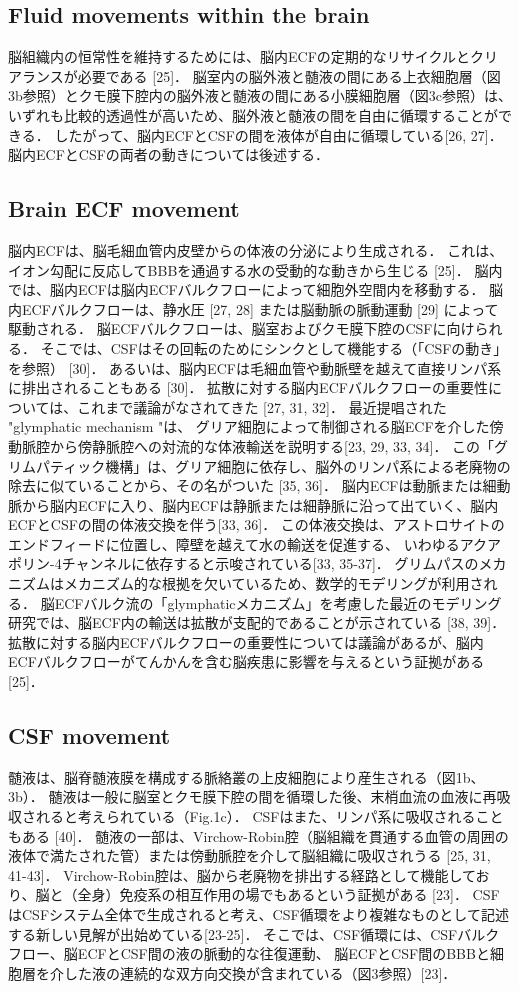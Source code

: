 \documentclass[11pt,a4paper]{jsarticle}
\begin{document}
\subsection{Fluid movements within the brain}
脳組織内の恒常性を維持するためには、脳内ECFの定期的なリサイクルとクリアランスが必要である [25]．
脳室内の脳外液と髄液の間にある上衣細胞層（図3b参照）とクモ膜下腔内の脳外液と髄液の間にある小膜細胞層（図3c参照）は、
いずれも比較的透過性が高いため、脳外液と髄液の間を自由に循環することができる．
したがって、脳内ECFとCSFの間を液体が自由に循環している[26, 27]．
脳内ECFとCSFの両者の動きについては後述する．
\subsection{Brain ECF movement}
脳内ECFは、脳毛細血管内皮壁からの体液の分泌により生成される．
これは、イオン勾配に反応してBBBを通過する水の受動的な動きから生じる [25]．
脳内では、脳内ECFは脳内ECFバルクフローによって細胞外空間内を移動する．
脳内ECFバルクフローは、静水圧 [27, 28] または脳動脈の脈動運動 [29] によって駆動される．
脳ECFバルクフローは、脳室およびクモ膜下腔のCSFに向けられる．
そこでは、CSFはその回転のためにシンクとして機能する（「CSFの動き」を参照） [30]．
あるいは、脳内ECFは毛細血管や動脈壁を越えて直接リンパ系に排出されることもある [30]．
拡散に対する脳内ECFバルクフローの重要性については、これまで議論がなされてきた [27, 31, 32]．
最近提唱された "glymphatic mechanism "は、
グリア細胞によって制御される脳ECFを介した傍動脈腔から傍静脈腔への対流的な体液輸送を説明する[23, 29, 33, 34]．
この「グリムパティック機構」は、グリア細胞に依存し、脳外のリンパ系による老廃物の除去に似ていることから、その名がついた [35, 36]．
脳内ECFは動脈または細動脈から脳内ECFに入り、脳内ECFは静脈または細静脈に沿って出ていく、脳内ECFとCSFの間の体液交換を伴う[33, 36]．
この体液交換は、アストロサイトのエンドフィードに位置し、障壁を越えて水の輸送を促進する、
いわゆるアクアポリン-4チャンネルに依存すると示唆されている[33, 35-37]．
グリムパスのメカニズムはメカニズム的な根拠を欠いているため、数学的モデリングが利用される．
脳ECFバルク流の「glymphaticメカニズム」を考慮した最近のモデリング研究では、脳ECF内の輸送は拡散が支配的であることが示されている [38, 39]．
拡散に対する脳内ECFバルクフローの重要性については議論があるが、脳内ECFバルクフローがてんかんを含む脳疾患に影響を与えるという証拠がある[25]．
\subsection{CSF movement}
髄液は、脳脊髄液膜を構成する脈絡叢の上皮細胞により産生される（図1b、3b）．
髄液は一般に脳室とクモ膜下腔の間を循環した後、末梢血流の血液に再吸収されると考えられている（Fig.1c）．
CSFはまた、リンパ系に吸収されることもある [40]．
髄液の一部は、Virchow-Robin腔（脳組織を貫通する血管の周囲の液体で満たされた管）または傍動脈腔を介して脳組織に吸収されうる [25, 31, 41-43]．
Virchow-Robin腔は、脳から老廃物を排出する経路として機能しており、脳と（全身）免疫系の相互作用の場でもあるという証拠がある [23]．
CSFはCSFシステム全体で生成されると考え、CSF循環をより複雑なものとして記述する新しい見解が出始めている[23-25]．
そこでは、CSF循環には、CSFバルクフロー、脳ECFとCSF間の液の脈動的な往復運動、
脳ECFとCSF間のBBBと細胞層を介した液の連続的な双方向交換が含まれている（図3参照）[23]．
\end{document}
